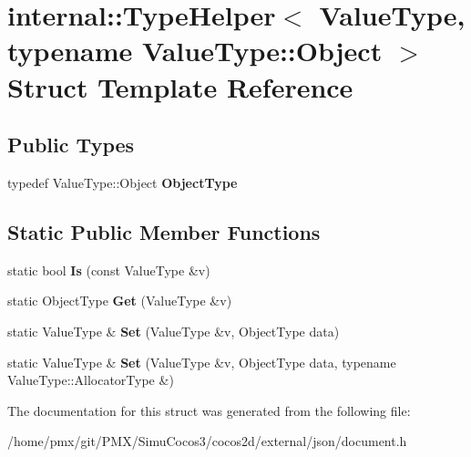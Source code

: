 \hypertarget{structinternal_1_1TypeHelper_3_01ValueType_00_01typename_01ValueType_1_1Object_01_4}{}\section{internal\+:\+:Type\+Helper$<$ Value\+Type, typename Value\+Type\+:\+:Object $>$ Struct Template Reference}
\label{structinternal_1_1TypeHelper_3_01ValueType_00_01typename_01ValueType_1_1Object_01_4}
\subsection*{Public Types}
\begin{DoxyCompactItemize}
\item 
\mbox{\label{structinternal_1_1TypeHelper_3_01ValueType_00_01typename_01ValueType_1_1Object_01_4_ac5d59bffe76792786fd5f1ba4da94dd9}} 
typedef Value\+Type\+::\+Object {\bfseries Object\+Type}
\end{DoxyCompactItemize}
\subsection*{Static Public Member Functions}
\begin{DoxyCompactItemize}
\item 
\mbox{\label{structinternal_1_1TypeHelper_3_01ValueType_00_01typename_01ValueType_1_1Object_01_4_a6c8bcb7479d2c4c96ae6dcaac808e227}} 
static bool {\bfseries Is} (const Value\+Type \&v)
\item 
\mbox{\label{structinternal_1_1TypeHelper_3_01ValueType_00_01typename_01ValueType_1_1Object_01_4_ae1debd6b9c125d4206e43a74ddbd0795}} 
static Object\+Type {\bfseries Get} (Value\+Type \&v)
\item 
\mbox{\label{structinternal_1_1TypeHelper_3_01ValueType_00_01typename_01ValueType_1_1Object_01_4_a7655ed9b6c7443d99063ec20769b9984}} 
static Value\+Type \& {\bfseries Set} (Value\+Type \&v, Object\+Type data)
\item 
\mbox{\label{structinternal_1_1TypeHelper_3_01ValueType_00_01typename_01ValueType_1_1Object_01_4_a41825b964c6188a07539b7ab2e6ed194}} 
static Value\+Type \& {\bfseries Set} (Value\+Type \&v, Object\+Type data, typename Value\+Type\+::\+Allocator\+Type \&)
\end{DoxyCompactItemize}


The documentation for this struct was generated from the following file\+:\begin{DoxyCompactItemize}
\item 
/home/pmx/git/\+P\+M\+X/\+Simu\+Cocos3/cocos2d/external/json/document.\+h\end{DoxyCompactItemize}
